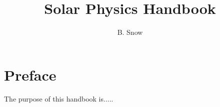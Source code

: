 \documentclass{report}
\title{Solar Physics Handbook}
\author{B. Snow}
\date{}
\begin{document}
\maketitle

\newpage

\tableofcontents

\newpage

\section*{Preface}

The purpose of this handbook is.....



\end{document}

